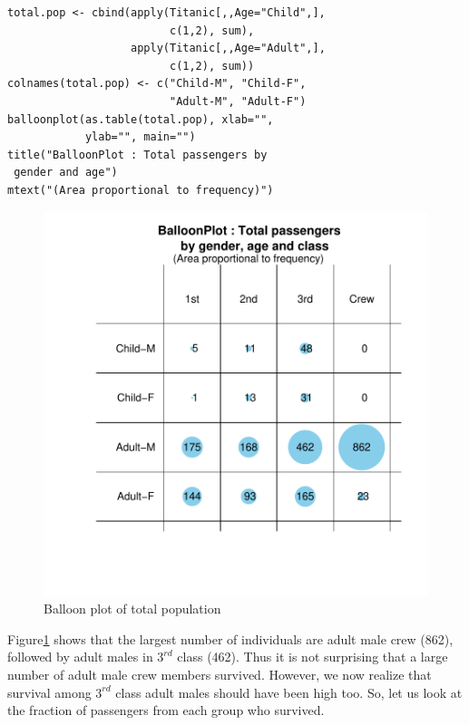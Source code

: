 \documentclass[a4paper]{report}
\begin{document}
\begin{article}
{\small
\begin{verbatim}
total.pop <- cbind(apply(Titanic[,,Age="Child",],
                         c(1,2), sum), 
                   apply(Titanic[,,Age="Adult",], 
                         c(1,2), sum))
colnames(total.pop) <- c("Child-M", "Child-F", 
                         "Adult-M", "Adult-F")
balloonplot(as.table(total.pop), xlab="",
            ylab="", main="")
title("BalloonPlot : Total passengers by
 gender and age")
mtext("(Area proportional to frequency)")
\end{verbatim}
 }


\begin{figure}[h]
\includegraphics[width=\textwidth]{TotalPop.pdf}
\vspace{-0.65in}
\caption{\label{figure:Total.Pop}
Balloon plot of total population}
\end{figure}

Figure\ref{figure:Total.Pop} shows that the largest number of
individuals are adult male crew (862), followed by adult males in
$3^{rd}$ class (462).  Thus it is not surprising that a large number
of adult male crew members survived.  However, we now realize that
survival among $3^{rd}$ class adult males should have been high too.
So, let us look at the fraction of passengers from each group who
survived.


\end{article}
\end{document}
